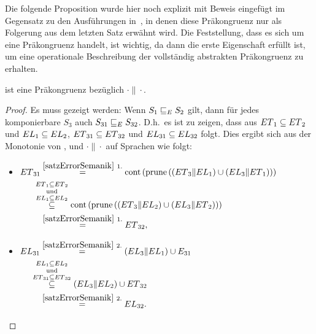 Die folgende Proposition wurde hier noch explizit mit Beweis eingefügt im
Gegensatz zu den Ausführungen in~\cite{Vogler2014EIO}, in denen diese
Präkongruenz nur als Folgerung aus dem letzten Satz erwähnt wird. Die
Feststellung, dass es sich um eine Präkongruenz handelt, ist wichtig, da
dann die erste Eigenschaft erfüllt ist, um eine operationale Beschreibung der
vollständig abstrakten Präkongruenz \ECRel{} zu erhalten.

\begin{prop}
\label{propPraekongruenz}
  \ERel{} ist eine Präkongruenz bezüglich $\cdot\|\cdot$.
\end{prop}

\begin{proof}
  Es muss gezeigt werden: Wenn $S_1\sqsubseteq _E S_2$ gilt, dann für jedes
  komponierbare $S_3$ auch $S_{31}\sqsubseteq _E S_{32}$. D.h.\ es ist zu zeigen,
  dass aus $ET{}_1\subseteq ET{}_2$ und $EL{}_1\subseteq EL{}_2$,
  $ET{}_{31}\subseteq ET{}_{32}$ und $EL{}_{31}\subseteq
  EL{}_{32}$ folgt. Dies ergibt sich aus der Monotonie von \cont{},
  \prune{} und $\cdot \|\cdot$ auf Sprachen wie folgt:\\
  \begin{itemize}
    \item $\begin{aligned}[t]
        \ET{}_{31} &\overset{\ref{satzErrorSemanik}~1.}{=}
      \cont{}\left(\prune{}\left(\left(\ET{}_3\|\EL{}_1\right)\cup
          \left(\EL{}_3\|\ET{}_1\right)\right)\right)\\
      &\hspace{-0.3cm}\overset{\ET{}_1\subseteq
    \ET{}_2}{\overset{\mathrm{und}}{\overset{\EL{}_1\subseteq \EL{}_2}{\subseteq}}}
    \cont{}\left(\prune{}\left(\left(\ET{}_3\|\EL{}_2\right)\cup
        \left(\EL{}_3\|\ET{}_2\right)\right)\right)\\
    &\overset{\ref{satzErrorSemanik}~1.}{=} \ET{}_{32},
    \end{aligned}$
    \item $\begin{aligned}[t]
        \EL{}_{31} &\overset{\ref{satzErrorSemanik}~2.}{=} (\EL{}_3\|\EL{}_1)\cup
        E_{31}\\
        &\hspace{-0.4cm}\overset{\EL{}_1\subseteq
      \EL{}_2}{\overset{\mathrm{und}}{\overset{\ET{}_{31}\subseteq
      \ET{}_{32}}{\subseteq}}} (\EL{}_3\|\EL{}_2)\cup \ET{}_{32}\\
      &\overset{\ref{satzErrorSemanik}~2.}{=} \EL{}_{32}.
    \end{aligned}$
  \end{itemize}
\end{proof}

